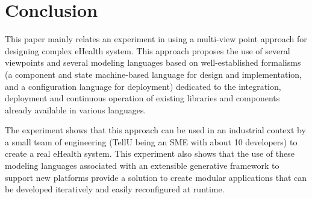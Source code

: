 \section{Conclusion}

This paper mainly relates an experiment in using a multi-view point approach for designing complex eHealth system. This approach proposes the use of several viewpoints and several modeling languages based on well-established formalisms (a component and state machine-based language for design and implementation, and a configuration language for deployment) dedicated to the integration, deployment and continuous operation of existing libraries and components already available in various languages. 

The experiment shows that this approach can be used in an industrial context by a small team of engineering (TellU being an SME with about 10 developers) to create a real eHealth system. This experiment also shows that the use of these modeling languages associated with an extensible generative framework to support new platforms provide a solution to create modular applications that can be developed iteratively and easily reconfigured at runtime. 

